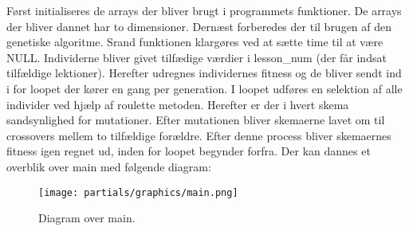 Først initialiseres de arrays der bliver brugt i programmets funktioner. De arrays der bliver dannet har to dimensioner.
Dernæst forberedes der til brugen af den genetiske algoritme. Srand funktionen klargøres ved at sætte time til at være NULL. %
Individerne bliver givet tilfædige værdier i lesson\_num (der får indsat tilfældige lektioner). Herefter udregnes individernes fitness og de bliver sendt ind i for loopet der kører en gang per generation. I loopet udføres en selektion af alle individer ved hjælp af roulette metoden. Herefter er der i hvert skema sandsynlighed for mutationer. Efter mutationen bliver skemaerne lavet om til crossovers mellem to tilfældige forældre. Efter denne process bliver skemaernes fitness igen regnet ud, inden for loopet begynder forfra. Der kan dannes et overblik over main med følgende diagram:
\begin{figure}[!h]
  \centering
  \texttt{[image: partials/graphics/main.png]}
  \caption{Diagram over main.}
  \label{fig:main}
\end{figure}
